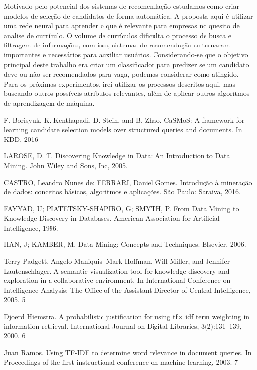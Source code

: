 \documentclass[conference]{IEEEtran}
\begin{document}
    Motivado pelo potencial dos sistemas de recomendação estudamos como criar modelos de seleção de candidatos de forma automática. A proposta aqui é utilizar uma rede neural para aprender o que é relevante para empresas no quesito de analise de currículo.
    O volume de currículos dificulta o processo de busca e filtragem de informações, com isso, sistemas de recomendação se tornaram importantes e necessários para auxiliar usuários.
    Considerando-se que o objetivo principal deste trabalho era criar um classificador para predizer se um candidato deve ou não ser recomendados para vaga, podemos considerar como atingido.
    Para os próximos experimentos, irei utilizar os processos descritos aqui, mas buscando outros possíveis atributos relevantes, além de aplicar outros algoritmos de aprendizagem de máquina.

\begin{thebibliography}

 F. Borisyuk, K. Kenthapadi, D. Stein, and B. Zhao. CaSMoS: A framework for
learning candidate selection models over structured queries and documents. In
KDD, 2016

 LAROSE, D. T. Discovering Knowledge in Data: An Introduction to Data Mining.
John Wiley and Sons, Inc, 2005.

 CASTRO, Leandro Nunes de; FERRARI, Daniel Gomes. Introdução à mineração de
dados: conceitos básicos, algoritmos e aplicações. São Paulo: Saraiva, 2016.

 FAYYAD, U; PIATETSKY-SHAPIRO, G; SMYTH, P. From Data Mining to Knowledge Discovery in Databases. American Association for Artificial Intelligence, 1996.

 HAN, J; KAMBER, M. Data Mining: Concepts and Techniques. Elsevier, 2006.

 Terry Padgett, Angelo Maniquis, Mark Hoffman, Will Miller, and Jennifer Lautenschlager. A semantic visualization tool for knowledge discovery and exploration in a
collaborative environment. In International Conference on Intelligence Analysis: The
Office of the Assistant Director of Central Intelligence, 2005. 5 

 Djoerd Hiemstra. A probabilistic justification for using tf$\times$ idf term weighting
in information retrieval. International Journal on Digital Libraries, 3(2):131–139,
2000. 6

 Juan Ramos. Using TF-IDF to determine word relevance in document queries.
In Proceedings of the first instructional conference on machine learning, 2003. 7


\end{thebibliography}
\end{document}
